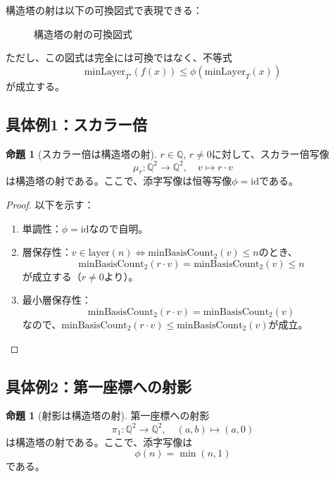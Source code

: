 \documentclass[11pt,a4paper]{ltjsarticle}
\theoremstyle{definition}
\newtheorem{proposition}[theorem]{命題}
\newcommand{\Q}{\mathbb{Q}}
\newcommand{\minLayer}{\mathrm{minLayer}}
\newcommand{\minBasis}{\mathrm{minBasisCount}}
\begin{document}
構造塔の射は以下の可換図式で表現できる：

\begin{figure}[h]
\centering
{}
\caption{構造塔の射の可換図式}
\end{figure}

ただし、この図式は完全には可換ではなく、不等式
\[
\minLayer_{T'}(f(x)) \leq \phi(\minLayer_T(x))
\]
が成立する。

\subsection{具体例1：スカラー倍}

\begin{proposition}[スカラー倍は構造塔の射]
$r \in \Q$, $r \neq 0$に対して、スカラー倍写像
\[
\mu_r: \Q^2 \to \Q^2, \quad v \mapsto r \cdot v
\]
は構造塔の射である。ここで、添字写像は恒等写像$\phi = \text{id}$である。
\end{proposition}

\begin{proof}
以下を示す：
\begin{enumerate}
\item 単調性：$\phi = \text{id}$なので自明。
\item 層保存性：$v \in \text{layer}(n) \Leftrightarrow \minBasis_2(v) \leq n$のとき、
\[
\minBasis_2(r \cdot v) = \minBasis_2(v) \leq n
\]
が成立する（$r \neq 0$より）。
\item 最小層保存性：
\[
\minBasis_2(r \cdot v) = \minBasis_2(v)
\]
なので、$\minBasis_2(r \cdot v) \leq \minBasis_2(v)$が成立。
\end{enumerate}
\end{proof}

\subsection{具体例2：第一座標への射影}

\begin{proposition}[射影は構造塔の射]
第一座標への射影
\[
\pi_1: \Q^2 \to \Q^2, \quad (a, b) \mapsto (a, 0)
\]
は構造塔の射である。ここで、添字写像は
\[
\phi(n) = \min(n, 1)
\]
である。
\end{proposition}
\end{document}

